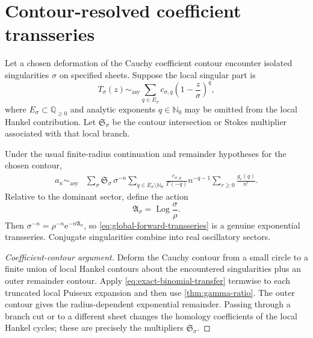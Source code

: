 \documentclass[11pt,a4paper,oneside,openany]{book}
\theoremstyle{definition}
\theoremstyle{remark}
\newcommand{\N}{\mathbb N}
\newcommand{\e}{\mathrm e}
\newcommand{\asympseries}{\sim_{\!\mathrm{asy}}}
\newcommand{\Action}{\mathfrak A}
\newcommand{\Stokes}{\mathfrak S}
\DeclareMathOperator{\Log}{Log}
\begin{document}
\section{Contour-resolved coefficient transseries}
Let a chosen deformation of the Cauchy coefficient contour encounter isolated
singularities $\sigma$ on specified sheets.  Suppose the local singular part is
\begin{equation}
 T_\sigma(z)\asympseries
 \sum_{q\in E_\sigma}c_{\sigma,q}
 \left(1-\frac z\sigma\right)^q,
 \label{eq:local-singular-general}
\end{equation}
where $E_\sigma\subset\mathbb Q_{\ge0}$ and analytic exponents
$q\in\N_0$ may be omitted from the local Hankel contribution.  Let
$\Stokes_\sigma$ be the contour intersection or Stokes multiplier associated
with that local branch.

\begin{resultbox}[title={Full contour-resolved forward transseries}]
Under the usual finite-radius continuation and remainder hypotheses for the
chosen contour,
\begin{align}
 a_n\asympseries{}&
 \sum_{\sigma}\Stokes_\sigma\,\sigma^{-n}
 \sum_{q\in E_\sigma\setminus\N_0}
 \frac{c_{\sigma,q}}{\Gamma(-q)}n^{-q-1}
 \sum_{r\ge0}\frac{g_r(q)}{n^r}.
 \label{eq:global-forward-transseries}
\end{align}
Relative to the dominant sector, define the action
\begin{equation}
 \Action_\sigma=\Log\frac{\sigma}{\rho}.
 \label{eq:action}
\end{equation}
Then $\sigma^{-n}=\rho^{-n}\e^{-n\Action_\sigma}$, so
\cref{eq:global-forward-transseries} is a genuine exponential transseries.
Conjugate singularities combine into real oscillatory sectors.
\end{resultbox}

\begin{proof}[Coefficient-contour argument]
Deform the Cauchy contour from a small circle to a finite union of local Hankel
contours about the encountered singularities plus an outer remainder contour.
Apply \cref{eq:exact-binomial-transfer} termwise to each truncated local
Puiseux expansion and then use \cref{thm:gamma-ratio}.  The outer contour gives
the radius-dependent exponential remainder.  Passing through a branch cut or
to a different sheet changes the homology coefficients of the local Hankel
cycles; these are precisely the multipliers $\Stokes_\sigma$.
\end{proof}
\end{document}
